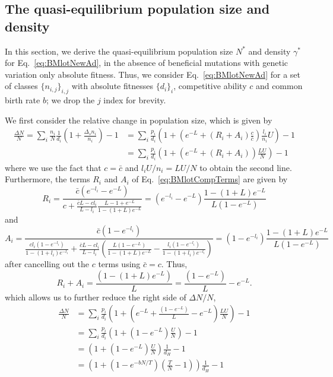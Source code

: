\documentclass[9pt,twocolumn,twoside]{article}
\begin{document}
\newpage
\onecolumn
\begin{appendix}
\section{The quasi-equilibrium population size and density}

In this section, we derive the quasi-equilibrium population size $N^*$ and density $\gamma^*$ for Eq.~\eqref{eq:BMlotNewAd}, in the absence of beneficial mutations with genetic variation only absolute fitness. Thus, we consider Eq.~\eqref{eq:BMlotNewAd} for a set of classes $\{n_{i,j}\}_{i,j}$ with absolute fitnesses $\{d_i\}_i$, competitive ability $c$ and common birth rate $b$; we drop the $j$ index for brevity. 

We first consider the relative change in population size, which is given by
\[
\begin{aligned}
\frac{\Delta N}{N} = \sum_i \frac{n_i}{N} \frac{1}{d_i}\left(1+ \frac{\Delta_s n_i}{n_i}\right)-1 &= \sum_i \frac{p_i}{d_i}\left(1+(e^{-L}+(R_i+A_i)\frac{c}{\bar{c}})\frac{l_{i}}{n_i} U\right)-1\\
&= \sum_i \frac{p_i }{d_i}\left(1+(e^{-L}+(R_i+A_i)) \frac{LU}{N}\right)-1
\end{aligned}
\]
where we use the fact that $c = \bar{c}$ and $l_iU/n_i = LU/N$ to obtain the second line. Furthermore, the terms $R_i$ and $A_i$ of Eq.~\eqref{eq:BMlotCompTerms} are given by 
\[
R_i = \frac{\bar{c}(e^{-l_i} -e^{-L}) }{c+\frac{\bar{c}L-cl_i}{L-l_i}\frac{L-1+e^{-L}}{1-(1+L)e^{-L}}} = (e^{-l_i} -e^{-L} )\frac{1-(1+L)e^{-L}}{L(1-e^{-L})} 
\]
and
\[
A_i = \frac{\bar{c}(1-e^{-l_i})}{\frac{ c l_i (1-e^{-l_i})}{1-(1+l_i)e^{-l_i} }+\frac{\bar{c}L-c l_i}{L-l_i} \left( \frac{L(1-e^{-L})}{1-(1+L)e^{-L}}-\frac{l_i(1-e^{-l_i})}{1-(1+l_i)e^{-l_i}}\right)} = (1-e^{-l_i})\frac{1-(1+L)e^{-L}}{L(1-e^{-L})}
\]
after cancelling out the $c$ terms using $\bar{c}=c$. Thus, 
\[
R_i + A_i = \frac{(1-(1+L)e^{-L})}{L} = \frac{(1-e^{-L})}{L}-e^{-L}.
\]
which allows us to further reduce the right side of $\Delta N/N$,
\[
\begin{aligned}
\frac{\Delta N}{N} &= \sum_i \frac{p_i }{d_i}\left(1+(e^{-L}+\frac{(1-e^{-L})}{L}-e^{-L}) \frac{LU}{N}\right)-1\\
&= \sum_i \frac{p_i }{d_i}\left(1+(1-e^{-L})\frac{U}{N}\right)-1\\
&= \left(1+(1-e^{-L})\frac{U}{N}\right)\frac{1}{d_H}-1\\
&= \left(1+(1-e^{-bN/T})\left(\frac{T}{N}-1\right)\right)\frac{1}{d_H}-1

\end{aligned}\]
\end{appendix}
\end{document}
